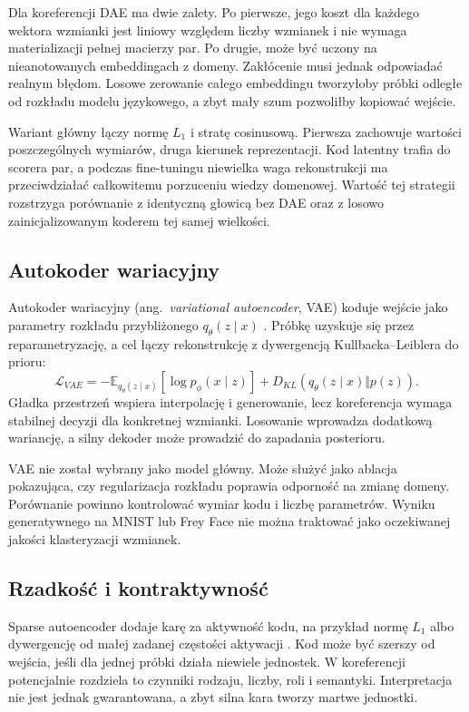 Dla koreferencji DAE ma dwie zalety. Po pierwsze, jego koszt dla każdego wektora wzmianki jest liniowy względem liczby wzmianek i nie wymaga materializacji pełnej macierzy par. Po drugie, może być uczony na nieanotowanych embeddingach z domeny. Zakłócenie musi jednak odpowiadać realnym błędom. Losowe zerowanie całego embeddingu tworzyłoby próbki odległe od rozkładu modelu językowego, a zbyt mały szum pozwoliłby kopiować wejście.

Wariant główny łączy normę $L_1$ i stratę cosinusową. Pierwsza zachowuje wartości poszczególnych wymiarów, druga kierunek reprezentacji. Kod latentny trafia do scorera par, a podczas fine-tuningu niewielka waga rekonstrukcji ma przeciwdziałać całkowitemu porzuceniu wiedzy domenowej. Wartość tej strategii rozstrzyga porównanie z identyczną głowicą bez DAE oraz z losowo zainicjalizowanym koderem tej samej wielkości.

\subsection{Autokoder wariacyjny}

Autokoder wariacyjny (ang.\ \emph{variational autoencoder}, VAE) koduje wejście jako parametry rozkładu przybliżonego $q_\theta(z\mid x)$ \cite{kingma_2013_vae}. Próbkę uzyskuje się przez reparametryzację, a cel łączy rekonstrukcję z dywergencją Kullbacka--Leiblera do prioru:
\[
\mathcal{L}_{VAE}=
-\mathbb{E}_{q_\theta(z\mid x)}[\log p_\phi(x\mid z)]
+D_{KL}(q_\theta(z\mid x)\Vert p(z)).
\]
Gładka przestrzeń wspiera interpolację i generowanie, lecz koreferencja wymaga stabilnej decyzji dla konkretnej wzmianki. Losowanie wprowadza dodatkową wariancję, a silny dekoder może prowadzić do zapadania posterioru.

VAE nie został wybrany jako model główny. Może służyć jako ablacja pokazująca, czy regularizacja rozkładu poprawia odporność na zmianę domeny. Porównanie powinno kontrolować wymiar kodu i liczbę parametrów. Wyniku generatywnego na MNIST lub Frey Face nie można traktować jako oczekiwanej jakości klasteryzacji wzmianek.

\subsection{Rzadkość i kontraktywność}

Sparse autoencoder dodaje karę za aktywność kodu, na przykład normę $L_1$ albo dywergencję od małej zadanej częstości aktywacji \cite{goodfellow_2016_deep}. Kod może być szerszy od wejścia, jeśli dla jednej próbki działa niewiele jednostek. W koreferencji potencjalnie rozdziela to czynniki rodzaju, liczby, roli i semantyki. Interpretacja nie jest jednak gwarantowana, a zbyt silna kara tworzy martwe jednostki.

